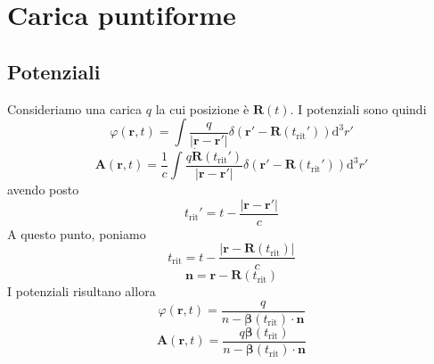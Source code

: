 \documentclass[a4paper,11pt]{article}
\renewcommand{\d}{\mathrm{d}}
\renewcommand{\vec}[1]{\mathbf{#1}}
\renewcommand{\t}{t_{\mathrm{rit}}}
\begin{document}
\section{Carica puntiforme}
\subsection{Potenziali}
Consideriamo una carica $q$ la cui posizione è $\vec{R}(t)$. I potenziali sono quindi
\[\varphi(\vec{r},t)=\int\frac{q}{|\vec{r}-\vec{r}'|}\delta\left(\vec{r}'-\vec{R}\left(\t'\right)\right)\d^3r'\]
\[\vec{A}(\vec{r},t)=\frac{1}{c}\int\frac{q\dot{\vec{R}}(\t')}{|\vec{r}-\vec{r}'|}\delta\left(\vec{r}'-\vec{R}\left(\t'\right)\right)\d^3r'\]
avendo posto
\[\t'=t-\frac{|\vec{r}-\vec{r}'|}{c}\]
A questo punto, poniamo
\[\t=t-\frac{|\vec{r}-\vec{R}(\t)|}{c}\]
\[\bm{n}=\vec{r}-\vec{R}(\t)\]
I potenziali risultano allora \[\varphi(\vec{r},t)=\frac{q}{n-\bm{\beta}(\t)\cdot\vec{n}}\]
\[\vec{A}(\vec{r},t)=\frac{q\bm{\beta}(\t)}{n-\bm{\beta}(\t)\cdot\vec{n}}\]
\end{document}
